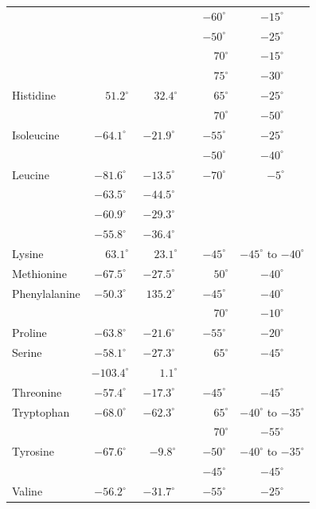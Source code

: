 \documentclass[12pt]{article}
\begin{document}
\begin{center}
\begin{tabular}{lccccc}
                 &      &       & & $-60^{\circ}$ & $-15^{\circ}$\\
                 &      &       & & $-50^{\circ}$ & $-25^{\circ}$\\
                 &      &       & & $\phantom{-}70^{\circ}$ & $-15^{\circ}$\\
                 &      &       & & $\phantom{-}75^{\circ}$ & $-30^{\circ}$\\
Histidine        & $\phantom{-}51.2^{\circ}$ & $\phantom{-}32.4^{\circ}$ & & $\phantom{-}65^{\circ}$ & $-25^{\circ}$  \\
		 &	 &	& & $\phantom{-}70^{\circ}$ & $-50^{\circ}$ \\
Isoleucine      & $-64.1^{\circ}$ & $-21.9^{\circ}$ & & $-55^{\circ}$ & $-25^{\circ}$ \\
		&	&	& & $-50^{\circ}$ & $-40^{\circ}$ \\
Leucine         & $-81.6^{\circ}$ & $-13.5^{\circ}$ & & $-70^{\circ}$ &  ~\,$-5^{\circ}$  \\
                & $-63.5^{\circ}$ & $-44.5^{\circ}$ & & & \\
                & $-60.9^{\circ}$ & $-29.3^{\circ}$ & & & \\
                & $-55.8^{\circ}$ & $-36.4^{\circ}$ & & & \\     
Lysine          & $\phantom{-}63.1^{\circ}$ & $\phantom{-}23.1^{\circ}$ & & $-45^{\circ}$ & $-45^{\circ}$ to $-40^{\circ}$ \\
Methionine      & $-67.5^{\circ}$ & $-27.5^{\circ}$ & & $\phantom{-}50^{\circ}$ & $-40^{\circ}$  \\
Phenylalanine   & $-50.3^{\circ}$ & \,\,$135.2^{\circ}$ & & $-45^{\circ}$ & $-40^{\circ}$  \\
                &       &       & & $\phantom{-}70^{\circ}$ & $-10^{\circ}$ \\
Proline         &  $-63.8^{\circ}$ & $-21.6^{\circ}$ & & $-55^{\circ}$ & $-20^{\circ}$  \\
Serine          & $-58.1^{\circ}$ & $-27.3^{\circ}$ & & $\phantom{-}65^{\circ}$ & $-45^{\circ}$ \\
		& $-103.4^{\circ}$ & $\phantom{-}\phantom{0}1.1^{\circ}$ & & & \\
Threonine       & $-57.4^{\circ}$ & $-17.3^{\circ}$ & & $-45^{\circ}$ & $-45^{\circ}$  \\
Tryptophan      & $-68.0^{\circ}$ & $-62.3^{\circ}$ & & $\phantom{-}65^{\circ}$ & $-40^{\circ}$ to $-35^{\circ}$  \\
		&       &       & & $\phantom{-}70^{\circ}$ & $-55^{\circ}$  \\
Tyrosine        & $-67.6^{\circ}$ & ~\,$-9.8^{\circ}$ & & $-50^{\circ}$ & $-40^{\circ}$ to $-35^{\circ}$ \\
                &       &       & & $-45^{\circ}$ & $-45^{\circ}$ \\
Valine          & $-56.2^{\circ}$ & $-31.7^{\circ}$ & & $-55^{\circ}$ & $-25^{\circ}$  \\
\hline
\end{tabular}
\end{center}
\end{document}
